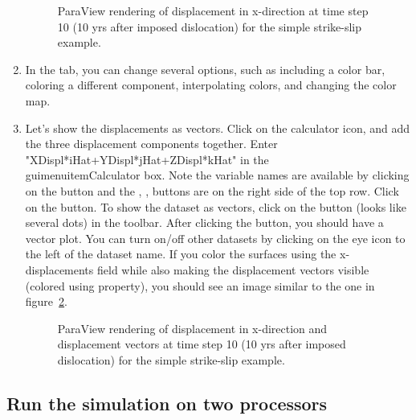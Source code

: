 \begin{enumerate}
  \begin{figure}[htbp]
    \begin{center}
      \caption{ParaView rendering of displacement in x-direction at
          time step 10 (10 yrs after imposed dislocation) for the
          simple strike-slip example.}
      \label{fig:splittest:xdisp:t10}
    \end{center}
  \end{figure}
  
\item In the  tab, you can change several options,
  such as including a color bar, coloring a different component,
  interpolating colors, and changing the color map.
\item Let's show the displacements as vectors. Click on the calculator
  icon, and add the three displacement components together. Enter
  "XDispl*iHat+YDispl*jHat+ZDispl*kHat" in the \\guimenuitem{Calculator}
  box. Note the variable names are available by clicking on the
   button and the ,
  ,  buttons are on the right side of
  the top row. Click on the  button. To show the
  dataset as vectors, click on the  button (looks
  like several dots) in the toolbar. After clicking the
   button, you should have a vector plot. You can
  turn on/off other datasets by clicking on the eye icon to the left
  of the dataset name. If you color the surfaces using the
  x-displacements field while also making the displacement vectors
  visible (colored using property), you should see an image similar to
  the one in figure~\ref{fig:splittest:xdisp:vec:t10}.

  \begin{figure}[htbp]
    \begin{center}
      \caption{ParaView rendering of displacement in x-direction and
        displacement vectors at time step 10 (10 yrs after imposed
        dislocation) for the simple strike-slip example.}
      \label{fig:splittest:xdisp:vec:t10}
    \end{center}
  \end{figure}      

\end{enumerate}

\subsection{Run the simulation on two processors}


